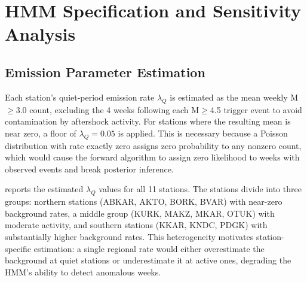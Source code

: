 \section{HMM Specification and Sensitivity Analysis}
\label{app:hmm}


\subsection{Emission Parameter Estimation}
\label{app:emission}

Each station's quiet-period emission rate $\lambda_Q$ is estimated as the mean weekly M$\geq$3.0 count, excluding the 4 weeks following each M$\geq$4.5 trigger event to 
avoid contamination by aftershock activity. For stations where the resulting mean is near zero, a floor of $\lambda_Q = 0.05$ is applied. This is necessary because a Poisson distribution with rate exactly zero assigns zero probability to any nonzero count, which would cause the forward algorithm to assign zero likelihood to weeks with observed events and break posterior inference.

\medskip
{} reports the estimated $\lambda_Q$ values for all 11 
stations. The stations divide into three groups: northern stations (ABKAR, AKTO, BORK, 
BVAR) with near-zero background rates, a middle group (KURK, MAKZ, MKAR, OTUK) with 
moderate activity, and southern stations (KKAR, KNDC, PDGK) with substantially higher 
background rates. This heterogeneity motivates station-specific estimation: a single 
regional rate would either overestimate the background at quiet stations or 
underestimate it at active ones, degrading the HMM's ability to detect anomalous weeks.

